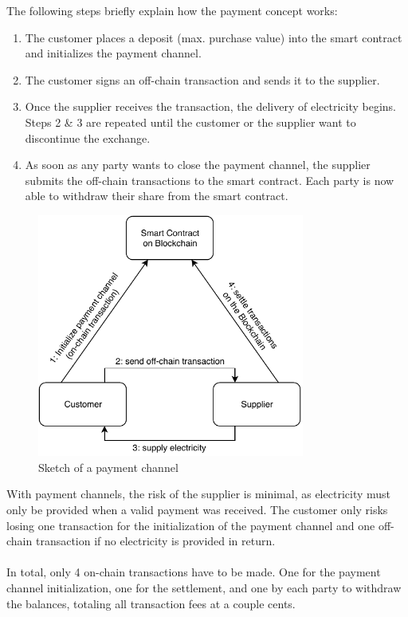 The following steps briefly explain how the payment concept works:
\\
\begin{enumerate}
    \item The customer places a deposit (max. purchase value) into the smart contract and initializes the payment channel.
    \item The customer signs an off-chain transaction and sends it to the supplier.
    \item Once the supplier receives the transaction, the delivery of electricity begins.
    Steps 2 \& 3 are repeated until the customer or the supplier want to discontinue the exchange.
    \item As soon as any party wants to close the payment channel, the supplier submits the off-chain transactions to the smart contract.
    Each party is now able to withdraw their share from the smart contract.
\end{enumerate}
\begin{figure}[H]
  \begin{center}
    \includegraphics[height=8cm]{img/payment_channel.pdf}
    \caption{Sketch of a payment channel}
    \label{fig:paymentchannel}
  \end{center}
\end{figure}
With payment channels, the risk of the supplier is minimal, as electricity must only be provided when a valid payment was received.
The customer only risks losing one transaction for the initialization of the payment channel and one off-chain transaction if no electricity is provided in return.
\\\\
In total, only 4 on-chain transactions have to be made.
One for the payment channel initialization, one for the settlement, and one by each party to withdraw the balances, totaling all transaction fees at a couple cents.
\newpage
